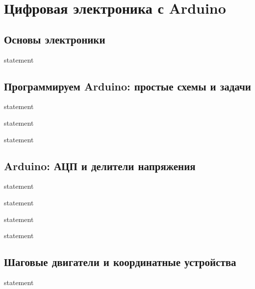 \chapter{Цифровая электроника с Arduino}

\section{Основы электроники}

{statement}

\section{Программируем Arduino: простые схемы и задачи}

{statement}

{statement}

{statement}


\section{Arduino: АЦП и делители напряжения}

{statement}

{statement}

{statement}

{statement}

\section{Шаговые двигатели и координатные устройства}

{statement}

